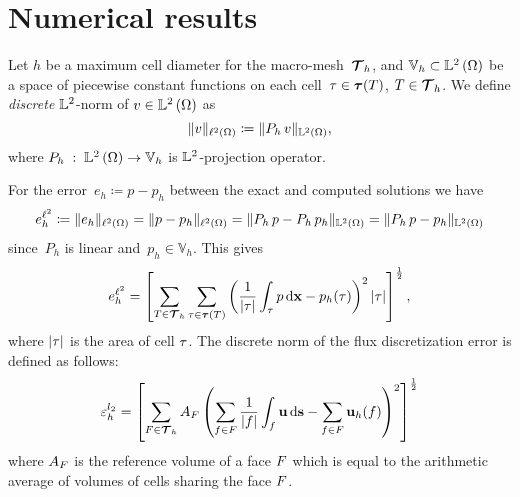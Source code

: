 \section{Numerical results}\label{sec:num}

Let $h$ be a maximum cell diameter for the macro-mesh~${\boldsymbol{\mathbf{\mathcal T}}}_h$, and $\mathbb V_h \subset {\mathbb L^2\left({\Omega}\right)}$ be a space of piecewise constant
functions on each cell~$\tau \in {\boldsymbol{\mathbf{\mathcal \tau}}}(T)$, $T \in {\boldsymbol{\mathbf{\mathcal T}}}_h$. We define \textit{discrete} ${\mathbb L^2}$-norm of $v \in {\mathbb L^2\left({\Omega}\right)}$ as
\begin{equation}\label{l2}
  \| v \|_{{\ell^2\left({\Omega}\right)}} \coloneqq \| P_h\,v \|_{{\mathbb L^2\left({\Omega}\right)}},
\end{equation}
where $P_h\;:\;{\mathbb L^2\left({\Omega}\right)}\rightarrow\mathbb V_h$ is ${\mathbb L^2}$-projection operator.

For the error~$e_h \coloneqq p - p_h$ between the exact and computed solutions we have
\begin{equation}\label{l2norm}
	e^{{\ell^2}}_{h} \coloneqq \| e_h \|_{{\ell^2\left({\Omega}\right)}} = \| p - p_h \|_{{\ell^2\left({\Omega}\right)}} = \| P_h\,p - P_h\,p_h \|_{{\mathbb L^2\left({\Omega}\right)}} = \| P_h\,p - p_h \|_{{\mathbb L^2\left({\Omega}\right)}}
\end{equation}
since~$P_h$ is linear and~$p_h \in \mathbb V_h$. %
This gives
$$
	e^{{\ell^2}}_{h} = \left[\sum\limits_{T \in {\boldsymbol{\mathbf{\mathcal T}}}_h}\sum\limits_{\tau\in{\boldsymbol{\mathbf{\mathcal \tau}}}(T)} \left(\frac{1}{|\tau|}\int_{\tau} p \mathop{}\!\mathrm{d}{\boldsymbol{\mathbf{x}}} - p_h(\tau)\right)^2|\tau|\right]^\frac12,
$$
        where $|\tau|$ is the area of cell $\tau$. The discrete norm of the flux discretization error is defined as follows:
        $$
        \varepsilon_h^{l_2} =  \left[\sum\limits_{F \in {\boldsymbol{\mathbf{\mathcal T}}}_h}
          A_F\left(
          \sum\limits_{f\in F}
          \frac{1}{|f|}\int_{f}
          \boldsymbol{\mathbf{u}} \mathop{}\!\mathrm{d}{\boldsymbol{\mathbf{s}}}  - \sum\limits_{f\in F}\boldsymbol{\mathbf{u}}_h(f)\right)^2
          \right]^\frac12
        $$
        where $A_F$ is the reference volume of a face $F$ which is equal to the arithmetic average
of volumes of cells sharing the face $F$.

